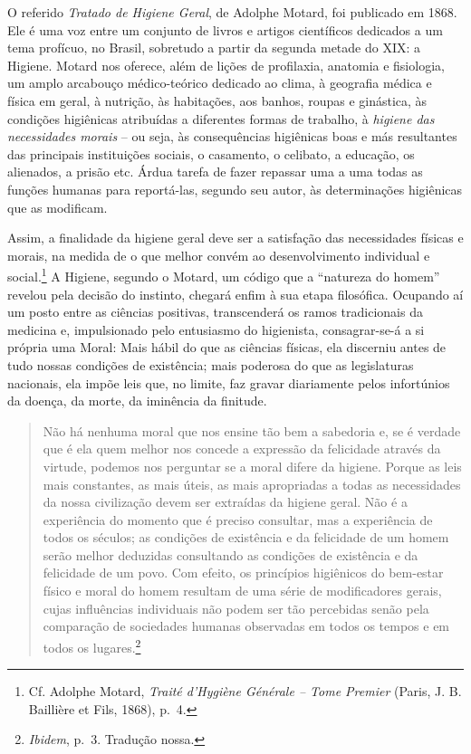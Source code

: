 O referido \emph{Tratado de Higiene Geral}, de Adolphe Motard, foi
publicado em 1868. Ele é uma voz entre um conjunto de livros e artigos
científicos dedicados a um tema profícuo, no Brasil, sobretudo a partir
da segunda metade do XIX: a Higiene. Motard nos oferece, além de lições
de profilaxia, anatomia e fisiologia, um amplo arcabouço médico-teórico
dedicado ao clima, à geografia médica e física em geral, à nutrição, às
habitações, aos banhos, roupas e ginástica, às condições higiênicas
atribuídas a diferentes formas de trabalho, à \emph{higiene das
necessidades morais} -- ou seja, às consequências higiênicas boas e más
resultantes das principais instituições sociais, o casamento, o
celibato, a educação, os alienados, a prisão etc. Árdua tarefa de fazer
repassar uma a uma todas as funções humanas para reportá-las, segundo
seu autor, às determinações higiênicas que as modificam.

Assim, a finalidade da higiene geral deve ser a satisfação das
necessidades físicas e morais, na medida de o que melhor convém ao
desenvolvimento individual e social.\footnote{Cf. Adolphe Motard,
  \emph{Traité d'Hygiène Générale -- Tome Premier} (Paris, J. B.
  Baillière et Fils, 1868), p.~4.} A Higiene, segundo o Motard, um
código que a ``natureza do homem'' revelou pela decisão do instinto,
chegará enfim à sua etapa filosófica. Ocupando aí um posto entre as
ciências positivas, transcenderá os ramos tradicionais da medicina e,
impulsionado pelo entusiasmo do higienista, consagrar-se-á a si própria
uma Moral: Mais hábil do que as ciências físicas, ela discerniu antes de
tudo nossas condições de existência; mais poderosa do que as
legislaturas nacionais, ela impõe leis que, no limite, faz gravar
diariamente pelos infortúnios da doença, da morte, da iminência da
finitude.

\begin{quote}
Não há nenhuma moral que nos ensine tão bem a sabedoria e, se é verdade
que é ela quem melhor nos concede a expressão da felicidade através da
virtude, podemos nos perguntar se a moral difere da higiene. Porque as
leis mais constantes, as mais úteis, as mais apropriadas a todas as
necessidades da nossa civilização devem ser extraídas da higiene geral.
Não é a experiência do momento que é preciso consultar, mas a
experiência de todos os séculos; as condições de existência e da
felicidade de um homem serão melhor deduzidas consultando as condições
de existência e da felicidade de um povo. Com efeito, os princípios
higiênicos do bem-estar físico e moral do homem resultam de uma série de
modificadores gerais, cujas influências individuais não podem ser tão
percebidas senão pela comparação de sociedades humanas observadas em
todos os tempos e em todos os lugares.\footnote{\emph{Ibidem}, p.~3.
  Tradução nossa.}
\end{quote}

